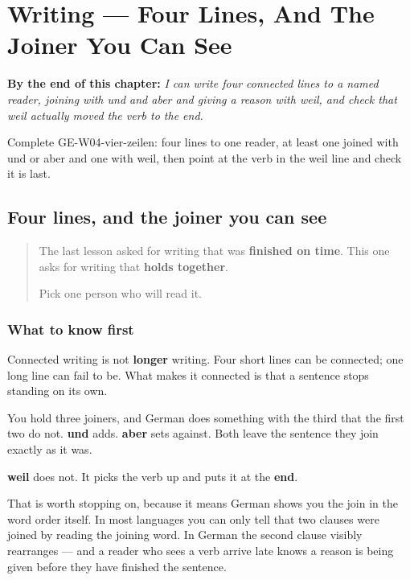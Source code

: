 
\chapter{Writing --- Four Lines, And The Joiner You Can See}
\label{ch:ge-vier-zeilen}

\begin{chapteropening}
\textbf{By the end of this chapter:} \emph{I can write four connected lines to a named reader, joining with und and aber and giving a reason with weil, and check that weil actually moved the verb to the end.}

Complete GE-W04-vier-zeilen: four lines to one reader, at least one joined with und or aber and one with weil, then point at the verb in the weil line and check it is last.
\end{chapteropening}

\section[weil]{Four lines, and the joiner you can see}

\label{lesson:GE-W04-vier-zeilen}



\begin{quote}
The last lesson asked for writing that was \textbf{finished on time}. This one asks for writing that \textbf{holds together}.

Pick one person who will read it.
\end{quote}

\subsection*{What to know first}
Connected writing is not \textbf{longer} writing. Four short lines can be connected; one long line can fail to be. What makes it connected is that a sentence stops standing on its own.

You hold three joiners, and German does something with the third that the first two do not. \textbf{und} adds. \textbf{aber} sets against. Both leave the sentence they join exactly as it was.

\textbf{weil} does not. It picks the verb up and puts it at the \textbf{end}.

That is worth stopping on, because it means German shows you the join in the word order itself. In most languages you can only tell that two clauses were joined by reading the joining word. In German the second clause visibly rearranges — and a reader who sees a verb arrive late knows a reason is being given before they have finished the sentence.

